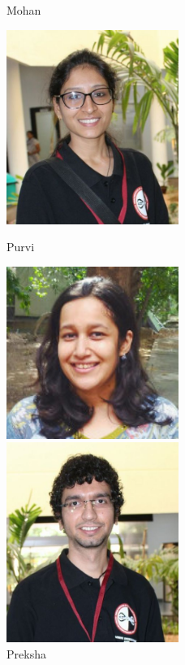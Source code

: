 \begin{frame}
\begin{figure}[ht]
\begin{minipage}[b]{0.22\linewidth}
            \caption{Mohan}
            \label{fig:c}
        \end{minipage}
        \begin{minipage}[b]{0.23\linewidth}
            \centering
            \includegraphics[width=0.5\textwidth]{ta_images/purvi.jpeg}
            \caption{Purvi}
            \label{fig:c}
        \end{minipage}
                \begin{minipage}[b]{0.23\linewidth}
            \centering
            \includegraphics[width=0.5\textwidth]{ta_images/preksha.jpg}
            \caption{Preksha}
            \label{fig:c}
        \end{minipage}
        \begin{minipage}[b]{0.23\linewidth}
            \centering
            \includegraphics[width=0.5\textwidth]{ta_images/raviraj.jpeg}

\end{minipage}
\end{figure}
\end{frame}
